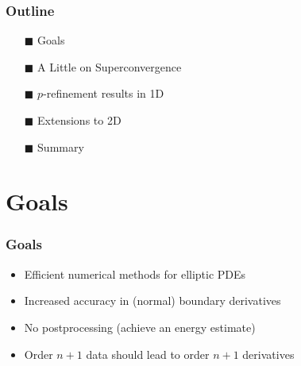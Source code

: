 \documentclass[8pt]{beamer}
\begin{document}




\begin{frame}
    \frametitle{Outline}
    \begin{itemize}
    \item[$\blacksquare$] Goals                                               \\
    \item[$\blacksquare$] A Little on Superconvergence                        \\
    \item[$\blacksquare$] \(p\)-refinement results in 1D                      \\
    \item[$\blacksquare$] Extensions to 2D                                    \\
    \item[$\blacksquare$] Summary                                             \\
    \end{itemize}
\end{frame}

\section{Goals}
    \begin{frame}
        \frametitle{Goals}
        \begin{itemize}
            \item Efficient numerical methods for elliptic PDEs
            \item Increased accuracy in (normal) boundary derivatives
            \item No postprocessing (achieve an energy estimate)
            \item Order \(n + 1\) data should lead to order \(n + 1\) derivatives
        \end{itemize}
    \end{frame}
\end{document}
